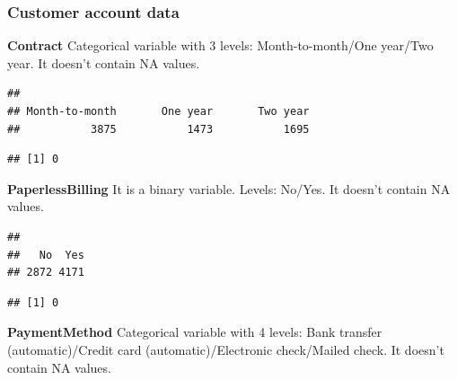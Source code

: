 \documentclass[
  twoside]{article}
\newenvironment{Shaded}{\begin{snugshade}}{\end{snugshade}}
\newcommand{\FunctionTok}[1]{\textcolor[rgb]{0.13,0.29,0.53}{\textbf{#1}}}
\newcommand{\NormalTok}[1]{#1}
\newcommand{\SpecialCharTok}[1]{\textcolor[rgb]{0.81,0.36,0.00}{\textbf{#1}}}
\begin{document}
\hypertarget{customer-account-data}{%
\subsubsection{Customer account data}\label{customer-account-data}}

\textbf{Contract} Categorical variable with 3 levels: Month-to-month/One
year/Two year. It doesn't contain NA values.

\begin{verbatim}
## 
## Month-to-month       One year       Two year 
##           3875           1473           1695
\end{verbatim}

\begin{verbatim}
## [1] 0
\end{verbatim}

\textbf{PaperlessBilling} It is a binary variable. Levels: No/Yes. It
doesn't contain NA values.

\begin{Shaded}
\end{Shaded}

\begin{verbatim}
## 
##   No  Yes 
## 2872 4171
\end{verbatim}

\begin{Shaded}
\end{Shaded}

\begin{verbatim}
## [1] 0
\end{verbatim}

\textbf{PaymentMethod} Categorical variable with 4 levels: Bank transfer
(automatic)/Credit card (automatic)/Electronic check/Mailed check. It
doesn't contain NA values.

\begin{Shaded}
\end{Shaded}
\end{document}
